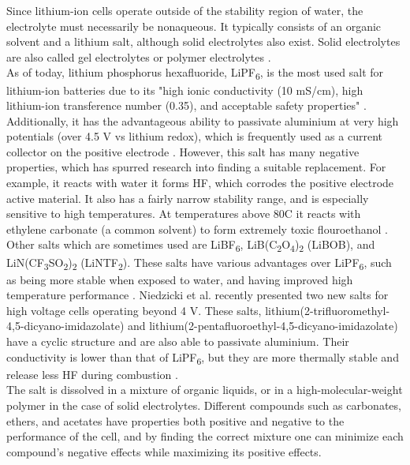 \documentclass[12pt]{article} %
\begin{document}
Since lithium-ion cells operate outside of the stability region of water, the electrolyte must necessarily be nonaqueous.
It typically consists of an organic solvent and a lithium salt, although solid electrolytes also exist.
Solid electrolytes are also called gel electrolytes or polymer electrolytes \cite{reddy_thomas_section_2011-3}.
\\
As of today, lithium phosphorus hexafluoride, LiPF\textsubscript{6}, is the most used salt for lithium-ion batteries due to its "high ionic conductivity (10 mS/cm), high lithium-ion transference number (\mytilde{}0.35), and acceptable safety properties" \cite{reddy_thomas_section_2011-3}.
Additionally, it has the advantageous ability to passivate aluminium at very high potentials (over 4.5 V vs lithium redox), which is frequently used as a current collector on the positive electrode \cite{niedzicki_new_2011}.
However, this salt has many negative properties, which has spurred research into finding a suitable replacement.
For example, it reacts with water it forms HF, which corrodes the positive electrode active material.
It also has a fairly narrow stability range, and is especially sensitive to high temperatures.
At temperatures above 80\degree C it reacts with ethylene carbonate (a common solvent) to form extremely toxic flouroethanol \cite{hammami_lithium-ion_2003}.
Other salts which are sometimes used are LiBF\textsubscript{6}, LiB(C\textsubscript{2}O\textsubscript{4})\textsubscript{2} (LiBOB), and LiN(CF\textsubscript{3}SO\textsubscript{2})\textsubscript{2} (LiNTF\textsubscript{2}).
These salts have various advantages over LiPF\textsubscript{6}, such as being more stable when exposed to water, and having improved high temperature performance \cite{reddy_thomas_section_2011-3}.
Niedzicki et al. recently presented two new salts for high voltage cells operating beyond 4 V.
These salts, lithium(2-trifluoromethyl-4,5-dicyano-imidazolate) and lithium(2-pentafluoroethyl-4,5-dicyano-imidazolate) have a cyclic structure and are also able to passivate aluminium.
Their conductivity is lower than that of LiPF\textsubscript{6}, but they are more thermally stable and release less HF during combustion \cite{niedzicki_new_2011}.
\\
The salt is dissolved in a mixture of organic liquids, or in a high-molecular-weight polymer in the case of solid electrolytes.
Different compounds such as carbonates, ethers, and acetates have properties both positive and negative to the performance of the cell, and by finding the correct mixture one can minimize each compound's negative effects while maximizing its positive effects.
\end{document}
